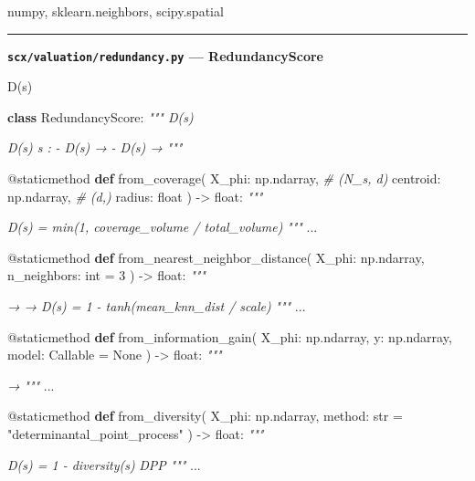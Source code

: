 \documentclass[
  12pt,
]{article}
\newenvironment{Shaded}{}{}
\newcommand{\AttributeTok}[1]{\textcolor[rgb]{0.49,0.56,0.16}{#1}}
\newcommand{\BuiltInTok}[1]{\textcolor[rgb]{0.00,0.50,0.00}{#1}}
\newcommand{\CommentTok}[1]{\textcolor[rgb]{0.38,0.63,0.69}{\textit{#1}}}
\newcommand{\DecValTok}[1]{\textcolor[rgb]{0.25,0.63,0.44}{#1}}
\newcommand{\KeywordTok}[1]{\textcolor[rgb]{0.00,0.44,0.13}{\textbf{#1}}}
\newcommand{\NormalTok}[1]{#1}
\newcommand{\OperatorTok}[1]{\textcolor[rgb]{0.40,0.40,0.40}{#1}}
\newcommand{\StringTok}[1]{\textcolor[rgb]{0.25,0.44,0.63}{#1}}
\newcommand{\VariableTok}[1]{\textcolor[rgb]{0.10,0.09,0.49}{#1}}
\begin{document}
numpy, sklearn.neighbors, scipy.spatial

\begin{center}\rule{0.5\linewidth}{0.5pt}\end{center}

\textbf{\texttt{scx/valuation/redundancy.py} --- RedundancyScore}

 D(s) 

\begin{Shaded}
\begin{Highlighting}[]
\KeywordTok{class}\NormalTok{ RedundancyScore:}
    \CommentTok{""" D(s) }

\CommentTok{    D(s)  s :}
\CommentTok{    {-}  D(s) → }
\CommentTok{    {-}  D(s) → }
\CommentTok{    """}

    \AttributeTok{@staticmethod}
    \KeywordTok{def}\NormalTok{ from\_coverage(}
\NormalTok{        X\_phi: np.ndarray,           }\CommentTok{\# (N\_s, d) }
\NormalTok{        centroid: np.ndarray,        }\CommentTok{\# (d,) }
\NormalTok{        radius: }\BuiltInTok{float}
\NormalTok{    ) }\OperatorTok{{-}\textgreater{}} \BuiltInTok{float}\NormalTok{:}
        \CommentTok{"""}

\CommentTok{        D(s) = min(1, coverage\_volume / total\_volume)}
\CommentTok{        """}
\NormalTok{        ...}

    \AttributeTok{@staticmethod}
    \KeywordTok{def}\NormalTok{ from\_nearest\_neighbor\_distance(}
\NormalTok{        X\_phi: np.ndarray,}
\NormalTok{        n\_neighbors: }\BuiltInTok{int} \OperatorTok{=} \DecValTok{3}
\NormalTok{    ) }\OperatorTok{{-}\textgreater{}} \BuiltInTok{float}\NormalTok{:}
        \CommentTok{"""}

\CommentTok{         →  → }
\CommentTok{        D(s) = 1 {-} tanh(mean\_knn\_dist / scale)}
\CommentTok{        """}
\NormalTok{        ...}

    \AttributeTok{@staticmethod}
    \KeywordTok{def}\NormalTok{ from\_information\_gain(}
\NormalTok{        X\_phi: np.ndarray,}
\NormalTok{        y: np.ndarray,}
\NormalTok{        model: Callable }\OperatorTok{=} \VariableTok{None}
\NormalTok{    ) }\OperatorTok{{-}\textgreater{}} \BuiltInTok{float}\NormalTok{:}
        \CommentTok{"""}

\CommentTok{         → }
\CommentTok{        """}
\NormalTok{        ...}

    \AttributeTok{@staticmethod}
    \KeywordTok{def}\NormalTok{ from\_diversity(}
\NormalTok{        X\_phi: np.ndarray,}
\NormalTok{        method: }\BuiltInTok{str} \OperatorTok{=} \StringTok{"determinantal\_point\_process"}
\NormalTok{    ) }\OperatorTok{{-}\textgreater{}} \BuiltInTok{float}\NormalTok{:}
        \CommentTok{"""}

\CommentTok{        D(s) = 1 {-} diversity(s)}
\CommentTok{         DPP }
\CommentTok{        """}
\NormalTok{        ...}
\end{Highlighting}
\end{Shaded}
\end{document}
